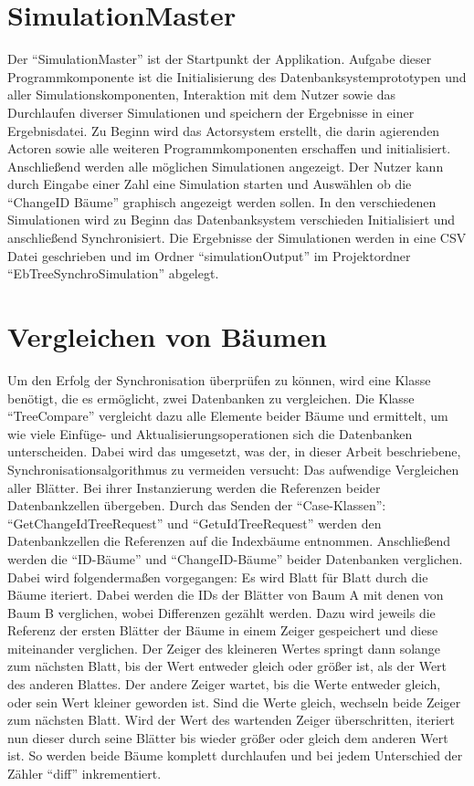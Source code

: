 \documentclass[a4paper,11pt,oneside,%
headsepline,												%
footsepline,												%
bibtotocnumbered									%
]{scrreprt}
\begin{document}
\section{SimulationMaster}
Der \enquote{SimulationMaster} ist der Startpunkt der Applikation. Aufgabe dieser Programmkomponente ist die Initialisierung des Datenbanksystemprototypen und aller Simulationskomponenten, Interaktion mit dem Nutzer sowie das Durchlaufen diverser Simulationen und speichern der Ergebnisse in einer Ergebnisdatei. Zu Beginn wird das Actorsystem erstellt, die darin agierenden Actoren sowie alle weiteren Programmkomponenten erschaffen und initialisiert. Anschließend werden alle möglichen Simulationen angezeigt. Der Nutzer kann durch Eingabe einer Zahl eine Simulation starten und Auswählen ob die \enquote{ChangeID Bäume} graphisch angezeigt werden sollen.
In den verschiedenen Simulationen wird zu Beginn das Datenbanksystem verschieden Initialisiert und anschließend Synchronisiert. Die Ergebnisse der Simulationen werden in eine CSV Datei geschrieben und im Ordner \enquote{simulationOutput} im Projektordner \enquote{EbTreeSynchroSimulation} abgelegt.


\section{Vergleichen von Bäumen}
\label{sec:DiffTrees}
Um den Erfolg der Synchronisation überprüfen zu können, wird eine Klasse benötigt, die es ermöglicht, zwei Datenbanken zu vergleichen. Die Klasse \enquote{TreeCompare} vergleicht dazu alle Elemente beider Bäume und ermittelt, um wie viele Einfüge- und Aktualisierungsoperationen sich die Datenbanken unterscheiden. Dabei wird das umgesetzt, was der, in dieser Arbeit beschriebene, Synchronisationsalgorithmus zu vermeiden versucht: Das aufwendige Vergleichen aller Blätter. Bei ihrer Instanzierung werden die Referenzen beider Datenbankzellen übergeben. Durch das Senden der \enquote{Case-Klassen}: \enquote{GetChangeIdTreeRequest} und \enquote{GetuIdTreeRequest} werden den Datenbankzellen die Referenzen auf die Indexbäume entnommen. Anschließend werden die \enquote{ID-Bäume} und \enquote{ChangeID-Bäume} beider Datenbanken verglichen. Dabei wird folgendermaßen vorgegangen: Es wird Blatt für Blatt durch die Bäume iteriert. Dabei werden die IDs der Blätter von Baum A mit denen von Baum B verglichen, wobei Differenzen gezählt werden. Dazu wird jeweils die Referenz der ersten Blätter der Bäume in einem Zeiger gespeichert und diese miteinander verglichen. Der Zeiger des kleineren Wertes springt dann solange zum nächsten Blatt, bis der Wert entweder gleich oder größer ist, als der Wert des anderen Blattes. Der andere Zeiger wartet, bis die Werte entweder gleich, oder sein Wert kleiner geworden ist. Sind die Werte gleich, wechseln beide Zeiger zum nächsten Blatt. Wird der Wert des wartenden Zeiger überschritten, iteriert nun dieser durch seine Blätter bis wieder größer oder gleich dem anderen Wert ist. So werden beide Bäume komplett durchlaufen und bei jedem Unterschied der Zähler \enquote{diff} inkrementiert. 
\end{document}
